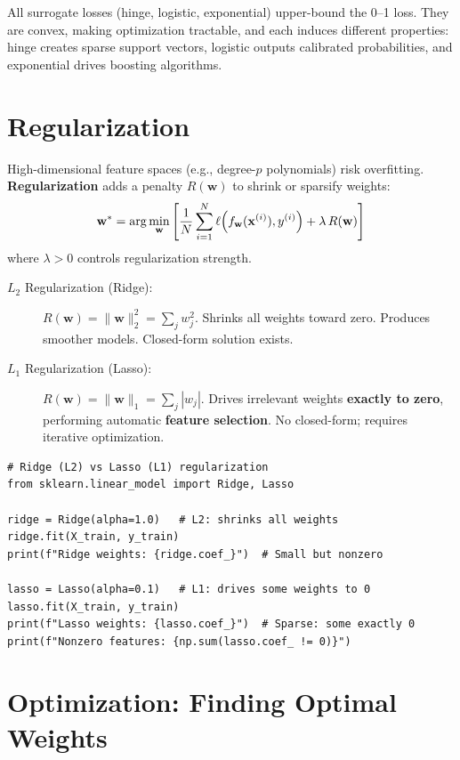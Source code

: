 \begin{remark}
All surrogate losses (hinge, logistic, exponential) upper-bound the 0--1 loss. They are convex, making optimization tractable, and each induces different properties: hinge creates sparse support vectors, logistic outputs calibrated probabilities, and exponential drives boosting algorithms.
\end{remark}

\section*{Regularization}

High-dimensional feature spaces (e.g., degree-$p$ polynomials) risk overfitting. \textbf{Regularization} adds a penalty $R(\mathbf{w})$ to shrink or sparsify weights:
$$\mathbf{w}^* = \arg\min_{\mathbf{w}} \left[ \frac{1}{N} \sum_{i=1}^{N} \ell\!\left(f_{\mathbf{w}}(\mathbf{x}^{(i)}), y^{(i)}\right) + \lambda\, R(\mathbf{w}) \right]$$
where $\lambda > 0$ controls regularization strength.

\begin{description}
    \item[$L_2$ Regularization (Ridge):] $R(\mathbf{w}) = \|\mathbf{w}\|_2^2 = \sum_j w_j^2$. Shrinks all weights toward zero. Produces smoother models. Closed-form solution exists.
    \item[$L_1$ Regularization (Lasso):] $R(\mathbf{w}) = \|\mathbf{w}\|_1 = \sum_j |w_j|$. Drives irrelevant weights \textbf{exactly to zero}, performing automatic \textbf{feature selection}. No closed-form; requires iterative optimization.
\end{description}

\begin{lstlisting}[style=pythonstyle]
# Ridge (L2) vs Lasso (L1) regularization
from sklearn.linear_model import Ridge, Lasso

ridge = Ridge(alpha=1.0)   # L2: shrinks all weights
ridge.fit(X_train, y_train)
print(f"Ridge weights: {ridge.coef_}")  # Small but nonzero

lasso = Lasso(alpha=0.1)   # L1: drives some weights to 0
lasso.fit(X_train, y_train)
print(f"Lasso weights: {lasso.coef_}")  # Sparse: some exactly 0
print(f"Nonzero features: {np.sum(lasso.coef_ != 0)}")
\end{lstlisting}

\section*{Optimization: Finding Optimal Weights}

